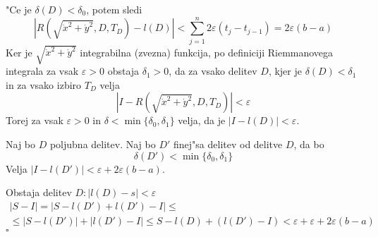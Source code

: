 "Ce je $\delta(D) < \delta_0$, potem sledi 
\begin{equation*}
\left| R\left( \sqrt{\dot{x}^2 + \dot{y}^2}, D, T_D \right) - l(D) \right| < \sum_{j=1}^n 2\varepsilon (t_j - t_{j-1}) = 2\varepsilon(b-a)
\end{equation*}
Ker je $\sqrt{\dot{x}^2 + \dot{y}^2}$ integrabilna (zvezna) funkcija, po definiciji Riemmanovega integrala za vsak $\varepsilon > 0$ obstaja $\delta_1 > 0$, da za vsako delitev $D$, kjer je $\delta(D) < \delta_1$ in za vsako izbiro $T_D$ velja
\begin{equation*}
|I -  R\left( \sqrt{\dot{x}^2 + \dot{y}^2}, D, T_D \right)| < \varepsilon
\end{equation*}
Torej za vsak $\varepsilon > 0$ in $\delta < \min \{\delta_0, \delta_1\}$ velja, da je $|I - l(D)| < \varepsilon$.


Naj bo $D$ poljubna delitev. Naj bo $D'$ finej"sa delitev od delitve $D$, da bo
\begin{equation*}
\delta(D') < \min\{\delta_0, \delta_1\}
\end{equation*}
Velja $|I - l(D')| < \varepsilon + 2 \varepsilon(b - a)$.

Obstaja delitev $D: |l(D) - s| < \varepsilon$
\begin{multline*}
|S - I| = |S - l(D') + l(D') - I| \leq \\
\leq |S - l(D')| + |l(D') - I| \leq S - l(D) + (l(D') - I) < \varepsilon + \varepsilon + 2\varepsilon(b-a)
\end{multline*}
\hfill $\square$